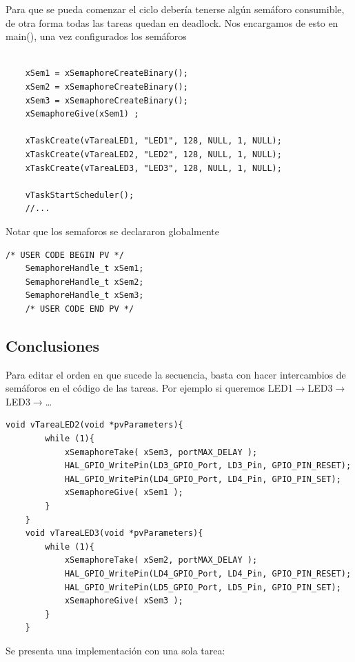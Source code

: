 \documentclass[12pt]{article}
\begin{document}
Para que se pueda comenzar el ciclo debería tenerse algún semáforo
consumible, de otra forma todas las tareas quedan en deadlock. Nos
encargamos de esto en main(), una vez configurados los semáforos
\begin{lstlisting}[style=CStyle]

    xSem1 = xSemaphoreCreateBinary();
    xSem2 = xSemaphoreCreateBinary();
    xSem3 = xSemaphoreCreateBinary();
    xSemaphoreGive(xSem1) ;
  
    xTaskCreate(vTareaLED1, "LED1", 128, NULL, 1, NULL);
    xTaskCreate(vTareaLED2, "LED2", 128, NULL, 1, NULL);
    xTaskCreate(vTareaLED3, "LED3", 128, NULL, 1, NULL);
  
    vTaskStartScheduler();
    //...
\end{lstlisting}
\pagebreak
Notar que los semaforos se declararon globalmente
\begin{lstlisting}[style=CStyle]
    /* USER CODE BEGIN PV */
    SemaphoreHandle_t xSem1;
    SemaphoreHandle_t xSem2;
    SemaphoreHandle_t xSem3;
    /* USER CODE END PV */
\end{lstlisting}
\subsection{Conclusiones}
Para editar el orden en que sucede la secuencia, basta con hacer
intercambios de semáforos en el código de las tareas.
Por ejemplo si queremos LED1$\rightarrow$LED3$\rightarrow$LED3$\rightarrow$\dots
\begin{lstlisting}[style=CStyle]
    void vTareaLED2(void *pvParameters){
        while (1){
            xSemaphoreTake( xSem3, portMAX_DELAY );
            HAL_GPIO_WritePin(LD3_GPIO_Port, LD3_Pin, GPIO_PIN_RESET);
            HAL_GPIO_WritePin(LD4_GPIO_Port, LD4_Pin, GPIO_PIN_SET);
            xSemaphoreGive( xSem1 );
        }
    }
    void vTareaLED3(void *pvParameters){
        while (1){
            xSemaphoreTake( xSem2, portMAX_DELAY );
            HAL_GPIO_WritePin(LD4_GPIO_Port, LD4_Pin, GPIO_PIN_RESET);
            HAL_GPIO_WritePin(LD5_GPIO_Port, LD5_Pin, GPIO_PIN_SET);
            xSemaphoreGive( xSem3 );
        }
    }
\end{lstlisting}

Se presenta una implementación con una sola tarea:
\end{document}

